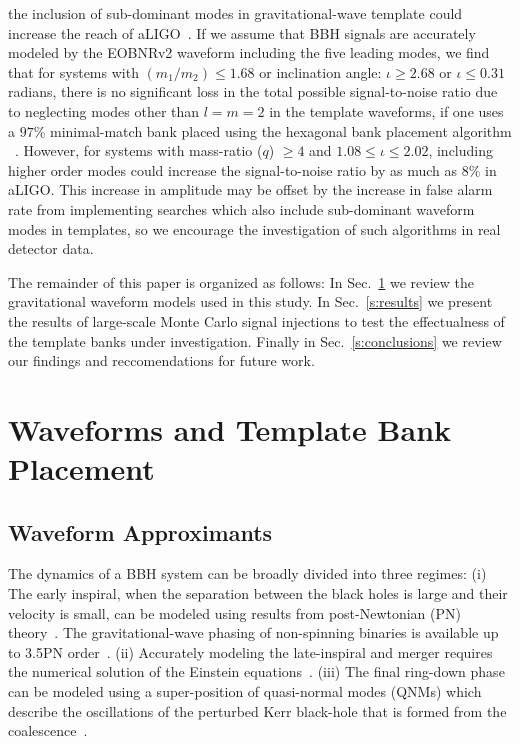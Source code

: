 the inclusion of sub-dominant modes in gravitational-wave template could
increase the reach of aLIGO~\cite{McKechan:2011ps,Pekowsky:2012sr}. If we
assume that BBH signals are accurately modeled by the EOBNRv2 waveform
including the five leading modes, we find that for systems with $(m_1/m_2)\leq
1.68$ or inclination angle: $\iota \geq 2.68$ or $\iota \leq 0.31$ radians, 
there is no significant loss in the total possible signal-to-noise ratio
due to neglecting modes other than $l = m = 2$ in the template waveforms,
if one uses a $97\%$ minimal-match bank placed using the hexagonal bank placement
algorithm ~\citep{SathyaBankPlacementTauN,BabaketalBankPlacement,SathyaMetric2PN,Cokelaer:2007kx}.
However, for systems with mass-ratio ($q$) $\geq 4$ and $1.08\leq\iota\leq 2.02$, including higher order modes could increase
the signal-to-noise ratio by as much as $8\%$ in aLIGO. This increase in
amplitude may be offset by the increase in false alarm rate from implementing
searches which also include sub-dominant waveform modes in templates, so we encourage the 
investigation of such algorithms in real detector data.

The remainder of this paper is organized as follows: In Sec.~\ref{s:waveforms}
we review the gravitational waveform models used in this study. In
Sec.~\ref{s:results} we present the results of large-scale Monte Carlo signal
injections to test the effectualness of the template banks under
investigation. Finally in Sec.~\ref{s:conclusions} we review our findings and
reccomendations for future work.

\section{Waveforms and Template Bank Placement}
\label{s:waveforms}
\subsection{Waveform Approximants}
The dynamics of a BBH system can be broadly divided into three regimes: (i) The 
early inspiral, when the separation between the black holes is large and their
velocity is small, can be modeled
using results from post-Newtonian (PN)
theory~\citep{PNtheoryLivingReviewBlanchet}. The gravitational-wave phasing of
non-spinning binaries is available up to 3.5PN
order~\citep{PNFluxEnergy3PN01,PNFluxEnergy3PN02,Jaranowski:1999qd,Jaranowski:1999ye,Damour:2001bu,KidderPN,Blanchet3PN}.
(ii) Accurately modeling the late-inspiral and merger requires the numerical
solution of the Einstein
equations~\citep{Pretorius2005,Pretorius2006,BBHNRScheel,BBHNRGonzalezq10,BBHNRPollney,BBHNRLoustoq10,Buchman:2012dw}.
(iii) The final ring-down phase can be modeled using a super-position of
quasi-normal modes (QNMs) which describe the oscillations of the perturbed Kerr
black-hole that is formed from the
coalescence~\citep{BHRDQNMs,BHPTMinoSasaki}. 


